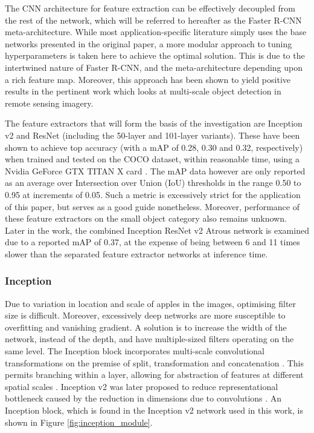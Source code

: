 \documentclass[journal]{IEEEtran}
\begin{document}
The CNN architecture for feature extraction can be effectively decoupled from the rest of the network, which will be referred to hereafter as the Faster R-CNN meta-architecture. While most application-specific literature simply uses the base networks presented in the original paper, a more modular approach to tuning hyperparameters is taken here to achieve the optimal solution. This is due to the intertwined nature of Faster R-CNN, and the meta-architecture depending upon a rich feature map. Moreover, this approach has been shown to yield positive results in the pertinent work \cite{remotesensingimagery} which looks at multi-scale object detection in remote sensing imagery.

The feature extractors that will form the basis of the investigation are Inception v2 and ResNet (including the 50-layer and 101-layer variants). These have been shown to achieve top accuracy (with a mAP of 0.28, 0.30 and 0.32, respectively) when trained and tested on the COCO dataset, within reasonable time, using a Nvidia GeForce GTX TITAN X card \cite{modelzoo}. The mAP data however are only reported as an average over Intersection over Union (IoU) thresholds in the range 0.50 to 0.95 at increments of 0.05. Such a metric is excessively strict for the application of this paper, but serves as a good guide nonetheless. Moreover, performance of these feature extractors on the small object category also remains unknown.
Later in the work, the combined Inception ResNet v2 Atrous network is examined due to a reported mAP of 0.37, at the expense of being between 6 and 11 times slower than the separated feature extractor networks at inference time.



\subsubsection{Inception}
Due to variation in location and scale of apples in the images, optimising filter size is difficult. Moreover, excessively deep networks are more susceptible to overfitting and vanishing gradient. A solution is to increase the width of the network, instead of the depth, and have multiple-sized filters operating on the same level. The Inception block incorporates multi-scale convolutional transformations on the premise of split, transformation and concatenation \cite{reviewpaperpakistan}. This permits branching within a layer, allowing for abstraction of features at different spatial scales \cite{inception}. Inception v2 was later proposed to reduce representational bottleneck caused by the reduction in dimensions due to convolutions \cite{inceptionv2}. An Inception block, which is found in the Inception v2 network used in this work, is shown in Figure \ref{fig:inception_module}.
\end{document}
